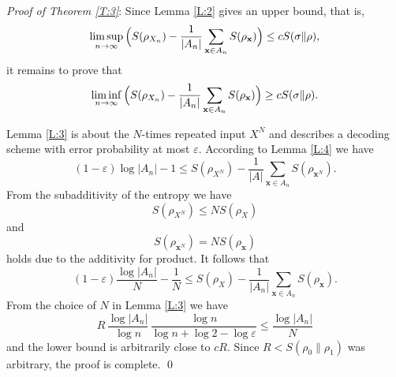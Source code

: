 \documentclass[12pt,a4paper]{article}
\def\eps{\varepsilon}
\def\bfx{\mathbf{x}}
\begin{document}
{\it Proof of Theorem \ref{T:3}}:
Since Lemma \ref{L:2} gives an upper bound, that is,
$$
\limsup_{n\to\infty}\Big( S(\rho_{X_n})-\frac{1}{|A_n|} \sum_{{\bf x} \in
A_n}
S(\rho_{{\bf x}}) \Big) \le cS(\sigma\|\rho),
$$
it remains to prove that
$$
\liminf_{n \to \infty} \Big( S(\rho_{X_n})-\frac{1}{|A_n|}
\sum_{{\bf x} \in A_n} S(\rho_{{\bf x}}) \Big) \ge cS(\sigma\|\rho).
$$

Lemma \ref{L:3} is about the $N$-times repeated input $X^N$ and describes
a decoding scheme with error probability at most $\eps$. According to
Lemma \ref{L:4} we have
$$
(1-\eps) \log |A_n| -1 \le S(\rho_{X^N})-\frac{1}{|A|}
\sum_{\bfx \in A_n} S(\rho_{\bfx^N}).
$$
 From the subadditivity of the entropy we have
$$
S(\rho_{X^N}) \le N S(\rho_{X})
$$
and
$$
S(\rho_{\bfx^N}) = N S(\rho_{\bfx})
$$
holds due to the additivity for product. It follows that
$$
(1-\eps) \frac{\log |A_n|}{N} -\frac{1}{N}
\le S(\rho_{X})-\frac{1}{|A_n|}\sum_{\bfx \in A_n} S(\rho_{\bfx}).
$$
 From the choice of $N$ in Lemma \ref{L:3} we have
$$
R \,\frac{\log |A_n|}{\log n}\,\frac{\log n}{\log n +\log 2 - \log \eps}
\le \frac{\log |A_n|}{N}
$$
and the lower bound is arbitrarily close to $cR$. Since
$R < S(\rho_0\| \rho_1)$ was arbitrary, the proof is complete. \qed
\end{document}
